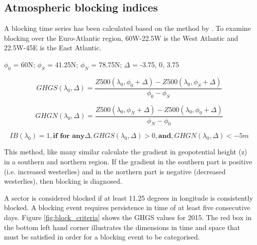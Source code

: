 \subsection{Atmospheric blocking indices}

A blocking time series has been calculated based on the method by \cite{davini2016northern}. To examine blocking over the Euro-Atlantic region, 60W-22.5W is the West Atlantic and 22.5W-45E is the East Atlantic.

$\phi_{0}$ = 60N; $\phi_{S}$ = 41.25N; $\phi_{N}$ = 78.75N; $\Delta$ = -3.75, 0, 3.75

\begin{equation} \label{eqblock1} %
GHGS(\lambda_{0}, \Delta) = \frac{Z500(\lambda_{0}, \phi_{0}+ \Delta) - Z500(\lambda_{0}, \phi_{S}+ \Delta)}
{\phi_{0} - \phi_{S}}
\end{equation}

\begin{equation} \label{eqblock2}
GHGN(\lambda_{0}, \Delta) = \frac{Z500(\lambda_{0}, \phi_{N}+ \Delta) - Z500(\lambda_{0}, \phi_{0}+ \Delta)}
{\phi_{N} - \phi_{0}}
\end{equation}


\begin{equation} \label{eqblock3}
IB(\lambda_{0}) = 1,   \textbf{if for any} \Delta ,  GHGS(\lambda_{0}, \Delta) > 0  , \textbf{and},   GHGN(\lambda_{0}, \Delta) < -5 m 
\end{equation}


This method, like many similar calculate the gradient in geopotential height (z) in a southern and northern region. If the gradient in the southern part is positive (i.e. increased westerlies) and in the northern part is negative (decreased westerlies), then blocking is diagnosed.



A sector is considered blocked if at least 11.25 degrees in longitude is consistently blocked. A blocking event requires persistence in time of at least five consecutive days. Figure \ref{fig:block_criteria} shows the GHGS values for 2015. The red box in the bottom left hand corner illustrates the dimensions in time and space that must be satisfied in order for a blocking event to be categorised.

